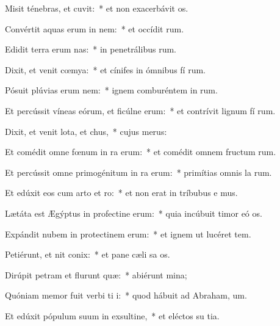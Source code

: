 \item Misit ténebras, et cuvit:~* et non exacerbávit  os.
\item Convértit aquas erum in nem:~* et occídit  rum.
\item Edidit terra erum nas:~* in penetrálibus  rum.
\item Dixit, et venit cœmya:~* et cínifes in ómnibus fí rum.
\item Pósuit plúvias erum nem:~* ignem comburéntem in  rum.
\item Et percússit víneas eórum, et ficúlne erum:~* et contrívit lignum fí rum.
\item Dixit, et venit lota, et chus,~* cujus   merus:
\item Et comédit omne fœnum in ra erum:~* et comédit omnem fructum  rum.
\item Et percússit omne primogénitum in ra erum:~* primítias omnis la rum.
\item Et edúxit eos cum arto et ro:~* et non erat in tríbubus e mus.
\item Lætáta est Ægýptus in profectine erum:~* quia incúbuit timor eó  os.
\item Expándit nubem in protectinem erum:~* et ignem ut lucéret   tem.
\item Petiérunt, et nit conix:~* et pane cæli sa os.
\item Dirúpit petram et flurunt quæ:~* abiérunt   mina;
\item Quóniam memor fuit verbi ti i:~* quod hábuit ad Abraham,  um.
\item Et edúxit pópulum suum in exsultine,~* et eléctos su  tia.
